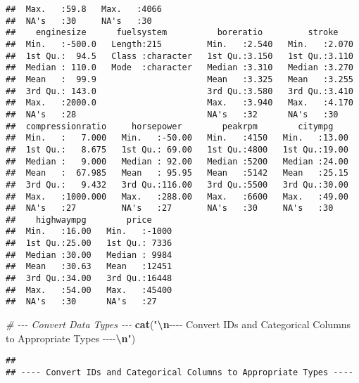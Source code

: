 \documentclass[
]{article}
\newenvironment{Shaded}{\begin{snugshade}}{\end{snugshade}}
\newcommand{\CommentTok}[1]{\textcolor[rgb]{0.56,0.35,0.01}{\textit{#1}}}
\newcommand{\FunctionTok}[1]{\textcolor[rgb]{0.13,0.29,0.53}{\textbf{#1}}}
\newcommand{\NormalTok}[1]{#1}
\newcommand{\SpecialCharTok}[1]{\textcolor[rgb]{0.81,0.36,0.00}{\textbf{#1}}}
\newcommand{\StringTok}[1]{\textcolor[rgb]{0.31,0.60,0.02}{#1}}
\begin{document}
\begin{verbatim}
##  Max.   :59.8   Max.   :4066                                        
##  NA's   :30     NA's   :30                                          
##    enginesize      fuelsystem          boreratio         stroke     
##  Min.   :-500.0   Length:215         Min.   :2.540   Min.   :2.070  
##  1st Qu.:  94.5   Class :character   1st Qu.:3.150   1st Qu.:3.110  
##  Median : 110.0   Mode  :character   Median :3.310   Median :3.270  
##  Mean   :  99.9                      Mean   :3.325   Mean   :3.255  
##  3rd Qu.: 143.0                      3rd Qu.:3.580   3rd Qu.:3.410  
##  Max.   :2000.0                      Max.   :3.940   Max.   :4.170  
##  NA's   :28                          NA's   :32      NA's   :30     
##  compressionratio     horsepower        peakrpm        citympg     
##  Min.   :   7.000   Min.   :-50.00   Min.   :4150   Min.   :13.00  
##  1st Qu.:   8.675   1st Qu.: 69.00   1st Qu.:4800   1st Qu.:19.00  
##  Median :   9.000   Median : 92.00   Median :5200   Median :24.00  
##  Mean   :  67.985   Mean   : 95.95   Mean   :5142   Mean   :25.15  
##  3rd Qu.:   9.432   3rd Qu.:116.00   3rd Qu.:5500   3rd Qu.:30.00  
##  Max.   :1000.000   Max.   :288.00   Max.   :6600   Max.   :49.00  
##  NA's   :27         NA's   :27       NA's   :30     NA's   :30     
##    highwaympg        price      
##  Min.   :16.00   Min.   :-1000  
##  1st Qu.:25.00   1st Qu.: 7336  
##  Median :30.00   Median : 9984  
##  Mean   :30.63   Mean   :12451  
##  3rd Qu.:34.00   3rd Qu.:16448  
##  Max.   :54.00   Max.   :45400  
##  NA's   :30      NA's   :27
\end{verbatim}

\begin{Shaded}
\begin{Highlighting}[]
\CommentTok{\# {-}{-}{-} Convert Data Types {-}{-}{-}}
\FunctionTok{cat}\NormalTok{(}\StringTok{"}\SpecialCharTok{\textbackslash{}n}\StringTok{{-}{-}{-}{-} Convert IDs and Categorical Columns to Appropriate Types {-}{-}{-}{-}}\SpecialCharTok{\textbackslash{}n}\StringTok{"}\NormalTok{)}
\end{Highlighting}
\end{Shaded}

\begin{verbatim}
## 
## ---- Convert IDs and Categorical Columns to Appropriate Types ----
\end{verbatim}
\end{document}
